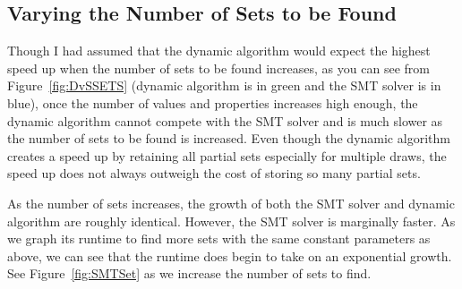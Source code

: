 \documentclass[pageno]{jpaper}
\begin{document}
\subsection{Varying the Number of Sets to be Found}

Though I had assumed that the dynamic algorithm would expect the highest speed up when the number of sets to be found increases, as you can see from Figure~\ref{fig:DvSSETS} (dynamic algorithm is in green and the SMT solver is in blue), once the number of values and properties increases high enough, the dynamic algorithm cannot compete with the SMT solver and is much slower as the number of sets to be found is increased. Even though the dynamic algorithm creates a speed up by retaining all partial sets especially for multiple draws, the speed up does not always outweigh the cost of storing so many partial sets.

As the number of sets increases, the growth of both the SMT solver and dynamic algorithm are roughly identical. However, the SMT solver is marginally faster. As we graph its runtime to find more sets with the same constant parameters as above, we can see that the runtime does begin to take on an exponential growth. See Figure~\ref{fig:SMTSet} as we increase the number of sets to find.
\end{document}
